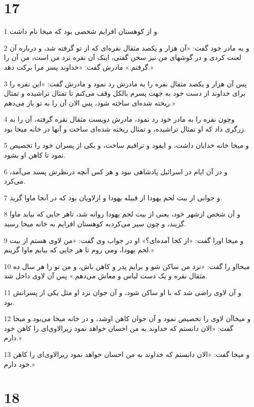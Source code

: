 \chapter{17}

\par 1 و از کوهستان افرایم شخصی بود که میخا نام داشت.
\par 2 و به مادر خود گفت: «آن هزار و یکصد مثقال نقره‌ای که از تو گرفته شد، و درباره آن لعنت کردی و در گوشهای من نیز سخن گفتی، اینک آن نقره نزد من است، من آن را گرفتم.» مادرش گفت: «خداوند پسر مرا برکت دهد.»
\par 3 پس آن هزار و یکصد مثقال نقره را به مادرش رد نمود و مادرش گفت: «این نقره را برای خداوند از دست خود به جهت پسرم بالکل وقف می‌کنم تا تمثال تراشیده و تمثال ریخته شده‌ای ساخته شود، پس الان آن را به تو باز می‌دهم.»
\par 4 وچون نقره را به مادر خود رد نمود، مادرش دویست مثقال نقره گرفته، آن را به زرگری داد که او تمثال تراشیده، و تمثال ریخته شده‌ای ساخت و آنها در خانه میخا بود.
\par 5 و میخا خانه خدایان داشت، و ایفود و ترافیم ساخت، و یکی از پسران خود را تخصیص نمود تا کاهن او بشود.
\par 6 و در آن ایام در اسرائیل پادشاهی نبود و هر کس آنچه درنظرش پسند می‌آمد، می‌کرد.
\par 7 و جوانی از بیت لحم یهودا از قبیله یهودا و ازلاویان بود که در آنجا ماوا گزید.
\par 8 و آن شخص ازشهر خود، یعنی از بیت لحم یهودا روانه شد، تاهر جایی که بیابد ماوا گزیند، و چون سیر می‌کردبه کوهستان افرایم به خانه میخا رسید.
\par 9 و میخا اورا گفت: «از کجا آمده‌ای؟» او در جواب وی گفت: «من لاوی هستم از بیت لحم یهودا، ومی روم تا هر جایی که بیابم ماوا گزینم.»
\par 10 میخااو را گفت: «نزد من ساکن شو و برایم پدر و کاهن باش، و من تو را هر سال ده مثقال نقره و یک دست لباس و معاش می‌دهم.» پس آن لاوی داخل شد.
\par 11 و آن لاوی راضی شد که با او ساکن شود، و آن جوان نزد او مثل یکی از پسرانش بود.
\par 12 و میخاآن لاوی را تخصیص نمود و آن جوان کاهن اوشد، و در خانه میخا می‌بود.و میخا گفت: «الان دانستم که خداوند به من احسان خواهد نمود زیرالاوی‌ای را کاهن خود دارم.»
\par 13 و میخا گفت: «الان دانستم که خداوند به من احسان خواهد نمود زیرالاوی‌ای را کاهن خود دارم.»
 
\chapter{18}

